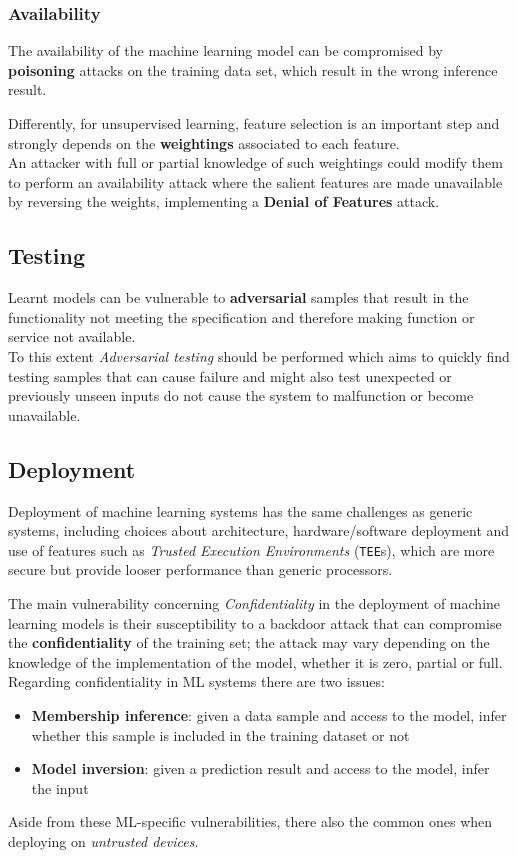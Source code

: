 \subsubsection{Availability}
The availability of the machine learning model can be compromised by
\textbf{poisoning} attacks on the training data set, which result in the wrong
inference result.

Differently, for unsupervised learning, feature selection is an important step and strongly depends on the \textbf{weightings} associated to each feature.\\
An attacker with full or partial knowledge of such weightings could
modify them to perform an availability attack where the salient
features are made unavailable by reversing the weights,
implementing a \textbf{Denial of Features} attack.

\subsection{Testing}
Learnt models can be vulnerable to \textbf{adversarial} samples that result in the
functionality not meeting the specification and therefore making function or service
not available.\\
To this extent \textit{Adversarial testing} should be performed which aims to quickly find testing samples that can cause failure
and might also test unexpected or previously unseen inputs do not cause the
system to malfunction or become unavailable.

\subsection{Deployment}
Deployment of machine learning systems has the same challenges as generic
systems, including choices about architecture, hardware/software deployment
and use of features such as \textit{Trusted Execution Environments} (\texttt{TEE}s),
which are more secure but provide looser performance than generic processors.


The main vulnerability concerning \textit{Confidentiality} in the deployment of machine learning models
is their susceptibility to a backdoor attack that can compromise the
\textbf{confidentiality} of the training set;
the attack may vary depending on the knowledge of the implementation of the model, whether it is zero, partial or full.
Regarding confidentiality in ML systems there are two issues:
\begin{itemize}
   \item \textbf{Membership inference}: given a data sample and access to the model, infer whether this sample is included in the training dataset or not
   \item \textbf{Model inversion}: given a prediction result and access to the model, infer the input
\end{itemize}
Aside from these ML-specific vulnerabilities, there also the common ones when deploying on \textit{untrusted devices}.
\nl

